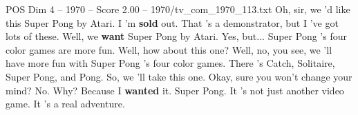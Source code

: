 \begin{textsample}{POS Dim 4 – 1970 – Score 2.00 – 1970/tv\_com\_1970\_113.txt}  \label{ex:f4_pos_032}
Oh, sir, we 'd like this Super Pong by Atari.
I 'm \textbf{sold} out.
That 's a demonstrator, but I 've got lots of these.
Well, we \textbf{want} Super Pong by Atari.
Yes, but...
Super Pong 's four color games are more fun.
Well, how about this one?
Well, no, you see, we 'll have more fun with Super Pong 's four color games.
There 's Catch, Solitaire, Super Pong, and Pong.
So, we 'll take this one.
Okay, sure you won't change your mind?
No.
Why?
Because I \textbf{wanted} it.
Super Pong.
It 's not just another video game.
It 's a real adventure.

\end{textsample}

